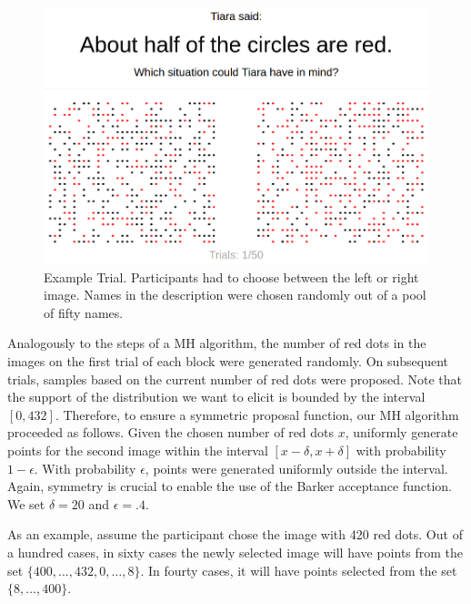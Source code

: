 \documentclass[english,floatsintext,man]{apa6}
\begin{document}
\begin{figure}[htbp]
\centering
\includegraphics{img/trial-image}
\caption{Example Trial. Participants had to choose between the left or
right image. Names in the description were chosen randomly out of a pool
of fifty names.}
\end{figure}

Analogously to the steps of a MH algorithm, the number of red dots in
the images on the first trial of each block were generated randomly. On
subsequent trials, samples based on the current number of red dots were
proposed. Note that the support of the distribution we want to elicit is
bounded by the interval \([0, 432]\). Therefore, to ensure a symmetric
proposal function, our MH algorithm proceeded as follows. Given the
chosen number of red dots \(x\), uniformly generate points for the
second image within the interval \([x - \delta, x + \delta]\) with
probability \(1 - \epsilon\). With probability \(\epsilon\), points were
generated uniformly outside the interval. Again, symmetry is crucial to
enable the use of the Barker acceptance function. We set \(\delta = 20\)
and \(\epsilon = .4\).

As an example, assume the participant chose the image with 420 red dots.
Out of a hundred cases, in sixty cases the newly selected image will
have points from the set \(\{400, \ldots, 432, 0, \ldots, 8\}\). In
fourty cases, it will have points selected from the set
\(\{8, \ldots, 400\}\).
\end{document}
